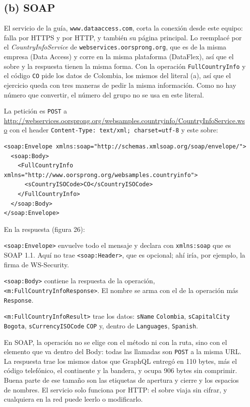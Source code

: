 \documentclass[11pt]{article}
\begin{document}
\subsection*{(b) SOAP}

El servicio de la guía, \texttt{www.dataaccess.com}, corta la conexión desde este equipo: falla por HTTPS y por HTTP, y también su página principal. Lo reemplacé por el \emph{CountryInfoService} de \texttt{webservices.oorsprong.org}, que es de la misma empresa (Data Access) y corre en la misma plataforma (DataFlex), así que el sobre y la respuesta tienen la misma forma. Con la operación \texttt{FullCountryInfo} y el código \texttt{CO} pide los datos de Colombia, los mismos del literal (a), así que el ejercicio queda con tres maneras de pedir la misma información. Como no hay número que convertir, el número del grupo no se usa en este literal.

La petición es \texttt{POST} a \url{http://webservices.oorsprong.org/websamples.countryinfo/CountryInfoService.wso} con el header \texttt{Content-Type: text/xml; charset=utf-8} y este sobre:

\begin{lstlisting}
<soap:Envelope xmlns:soap="http://schemas.xmlsoap.org/soap/envelope/">
  <soap:Body>
    <FullCountryInfo xmlns="http://www.oorsprong.org/websamples.countryinfo">
      <sCountryISOCode>CO</sCountryISOCode>
    </FullCountryInfo>
  </soap:Body>
</soap:Envelope>
\end{lstlisting}

En la respuesta (figura 26):

\begin{description}
  \raggedright
  \item[Envelope.] \texttt{<soap:Envelope>} envuelve todo el mensaje y declara con \texttt{xmlns:soap} que es SOAP 1.1. Aquí no trae \texttt{<soap:Header>}, que es opcional; ahí iría, por ejemplo, la firma de WS-Security.
  \item[Body.] \texttt{<soap:Body>} contiene la respuesta de la operación, \texttt{<m:FullCountryInfoResponse>}. El nombre se arma con el de la operación más \texttt{Response}.
  \item[Resultado.] \texttt{<m:FullCountryInfoResult>} trae los datos: \texttt{sName} \texttt{Colombia}, \texttt{sCapitalCity} \texttt{Bogota}, \texttt{sCurrencyISOCode} \texttt{COP} y, dentro de \texttt{Languages}, \texttt{Spanish}.
\end{description}

En SOAP, la operación no se elige con el método ni con la ruta, sino con el elemento que va dentro del Body: todas las llamadas son \texttt{POST} a la misma URL. La respuesta trae los mismos datos que GraphQL entregó en 110 bytes, más el código telefónico, el continente y la bandera, y ocupa 906 bytes sin comprimir. Buena parte de ese tamaño son las etiquetas de apertura y cierre y los espacios de nombres. El servicio solo funciona por HTTP: el sobre viaja sin cifrar, y cualquiera en la red puede leerlo o modificarlo.
\end{document}
